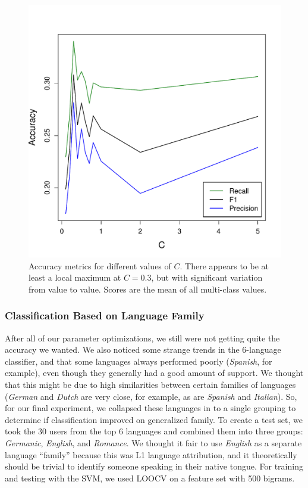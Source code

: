 \documentclass[11pt]{article}
\begin{document}
\begin{figure}[tb]
\centerline{\includegraphics[width=\linewidth]{figs/C_top6}}
\caption{Accuracy metrics for different values of $C$. There appears to be at least a local maximum at $C=0.3$, but with significant variation from value to value.  Scores are the mean of all multi-class values.}
\label{fig:C}
\end{figure}

\subsubsection{Classification Based on Language Family}\label{sec:fam}
After all of our parameter optimizations, we still were not getting quite the accuracy we wanted.  We also noticed some strange trends in the 6-language classifier, and that some languages always performed poorly ({\it Spanish}, for example), even though they generally had a good amount of support.  We thought that this might be due to high similarities between certain families of languages ({\it German} and {\it Dutch} are very close, for example, as are {\it Spanish} and {\it Italian}).  So, for our final experiment, we collapsed these languages in to a single grouping to determine if classification improved on generalized family.  To create a test set, we took the 30 users from the top 6 languages and combined them into three groups:  {\it Germanic}, {\it English}, and {\it Romance}.  We thought it fair to use {\it English} as a separate language ``family'' because this was L1 language attribution, and it theoretically should be trivial to identify someone speaking in their native tongue.  For training and testing with the SVM, we used LOOCV on a feature set with 500 bigrams.
\end{document}

